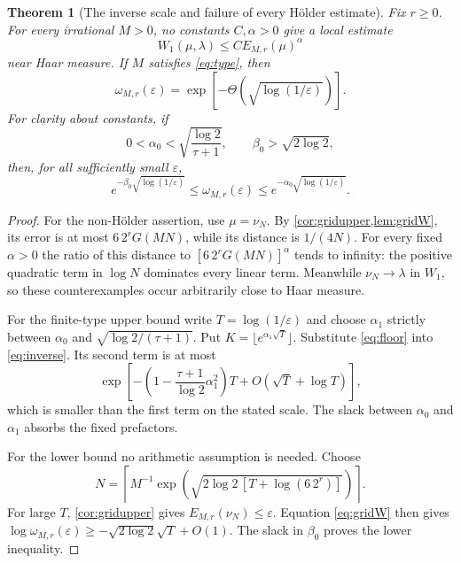 \documentclass[11pt,a4paper]{article}
\numberwithin{equation}{section}
\theoremstyle{plain}
\newtheorem{theorem}{Theorem}[section]
\theoremstyle{definition}
\theoremstyle{remark}
\begin{document}
\begin{theorem}[The inverse scale and failure of every H\"older estimate]
\label{thm:modulus}
Fix $r\ge0$.
For every irrational $M>0$, no constants $C,\alpha>0$ give a local estimate
\begin{equation}\label{eq:noholder}
 W_1(\mu,\lambda)\le C E_{M,r}(\mu)^\alpha
\end{equation}
near Haar measure. If $M$ satisfies \eqref{eq:type}, then
\begin{equation}\label{eq:omegascale}
 \omega_{M,r}(\varepsilon)
 =\exp[-\Theta(\sqrt{\log(1/\varepsilon)})].
\end{equation}
For clarity about constants, if
\[
 0<\alpha_0<\sqrt{\frac{\log2}{\tau+1}},
 \qquad \beta_0>\sqrt{2\log2},
\]
then, for all sufficiently small $\varepsilon$,
\begin{equation}\label{eq:omegaconstants}
 e^{-\beta_0\sqrt{\log(1/\varepsilon)}}
 \le\omega_{M,r}(\varepsilon)
 \le e^{-\alpha_0\sqrt{\log(1/\varepsilon)}}.
\end{equation}
\end{theorem}
\begin{proof}
For the non-H\"older assertion, use $\mu=\nu_N$.
By \cref{cor:gridupper,lem:gridW}, its error is at most
$6\,2^rG(MN)$, while its distance is $1/(4N)$.
For every fixed $\alpha>0$ the ratio of this distance to
$[6\,2^rG(MN)]^\alpha$ tends to infinity: the positive quadratic term in
$\log N$ dominates every linear term. Meanwhile $\nu_N\to\lambda$ in
$W_1$, so these counterexamples occur arbitrarily close to Haar measure.

For the finite-type upper bound write $T=\log(1/\varepsilon)$ and choose
$\alpha_1$ strictly between $\alpha_0$ and
$\sqrt{\log2/(\tau+1)}$. Put $K=\lfloor e^{\alpha_1\sqrt T}\rfloor$.
Substitute \eqref{eq:floor} into \eqref{eq:inverse}. Its second term is at
most
\[
 \exp\left[-\left(1-\frac{\tau+1}{\log2}\alpha_1^2\right)T
 +O(\sqrt T+\log T)\right],
\]
which is smaller than the first term on the stated scale. The slack between
$\alpha_0$ and $\alpha_1$ absorbs the fixed prefactors.

For the lower bound no arithmetic assumption is needed. Choose
\[
 N=\left\lceil M^{-1}
 \exp\!\left(\sqrt{2\log2\,[T+\log(6\,2^r)]}\right)\right\rceil.
\]
For large $T$, \cref{cor:gridupper} gives $E_{M,r}(\nu_N)\le\varepsilon$.
Equation \eqref{eq:gridW} then gives
$\log\omega_{M,r}(\varepsilon)\ge-\sqrt{2\log2}\sqrt T+O(1)$.
The slack in $\beta_0$ proves the lower inequality.
\end{proof}
\end{document}
